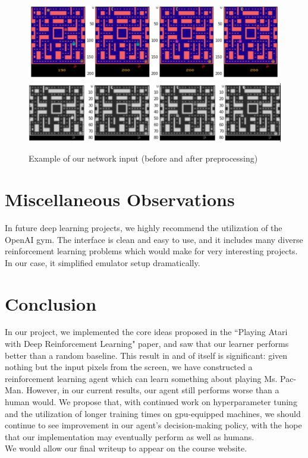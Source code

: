 \documentclass[paper=a4, fontsize=11pt]{scrartcl} %
\numberwithin{equation}{section} %
\numberwithin{figure}{section} %
\numberwithin{table}{section} %
\begin{document}
\begin{figure}[h]
\includegraphics[scale=0.275]{game_state}
\includegraphics[scale=0.275]{preprocessed_game_state}
\centering
\caption{Example of our network input (before and after preprocessing)}
\end{figure}

\section{Miscellaneous Observations}

In future deep learning projects, we highly recommend the utilization of the OpenAI gym. The interface is clean and easy to use, and it includes many diverse reinforcement learning problems which would make for very interesting projects. In our case, it simplified emulator setup dramatically.

\section{Conclusion}

In our project, we implemented the core ideas proposed in the ``Playing Atari with Deep Reinforcement Learning" paper, and saw that our learner performs better than a random baseline. This result in and of itself is significant: given nothing but the input pixels from the screen, we have constructed a reinforcement learning agent which can learn something about playing Ms. Pac-Man. However, in our current results, our agent still performs worse than a human would. We propose that, with continued work on hyperparameter tuning and the utilization of longer training times on gpu-equipped machines, we should continue to see improvement in our agent's decision-making policy, with the hope that our implementation may eventually perform as well as humans. \\

We would allow our final writeup to appear on the course website.
\end{document}
